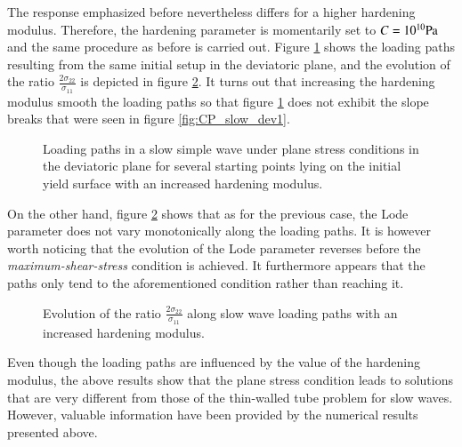 The response emphasized before nevertheless differs for a higher hardening modulus.
Therefore, the hardening parameter is momentarily set to $C=10^{10} \rm Pa$ and the same procedure as before is carried out.
Figure \ref{fig:CP_slow_dev2} shows the loading paths resulting from the same initial setup in the deviatoric plane, and the evolution of the ratio $\frac{2\sigma_{22}}{\sigma_{11}}$ is depicted in figure \ref{fig:CP_slow_singH}.
It turns out that increasing the hardening modulus smooth the loading paths so that figure \ref{fig:CP_slow_dev2} does not exhibit the slope breaks that were seen in figure \ref{fig:CP_slow_dev1}. 
\begin{figure}[h!]
  \centering
  
  \caption{Loading paths in a slow simple wave under plane stress conditions in the deviatoric plane for several starting points lying on the initial yield surface with an increased hardening modulus.}
  \label{fig:CP_slow_dev2}
\end{figure}
On the other hand, figure \ref{fig:CP_slow_singH} shows that as for the previous case, the Lode parameter does not vary monotonically along the loading paths.
It is however worth noticing that the evolution of the Lode parameter reverses before the \textit{maximum-shear-stress} condition is achieved.
It furthermore appears that the paths only tend to the aforementioned condition rather than reaching it.
\begin{figure}[h!]
  \centering
  { \label{subfig:CP_slow_singStressH} }
  { \label{subfig:CP_slow_singDevH} }
  
  \caption{Evolution of the ratio $\frac{2\sigma_{22}}{\sigma_{11}}$ along slow wave loading paths with an increased hardening modulus.}
  \label{fig:CP_slow_singH}
\end{figure}


Even though the loading paths are influenced by the value of the hardening modulus, the above results show that the plane stress condition leads to solutions that are very different from those of the thin-walled tube problem for slow waves.
However, valuable information have been provided by the numerical results presented above.

